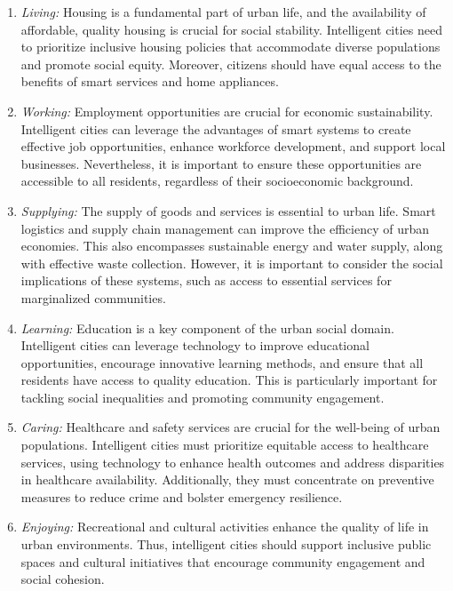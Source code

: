 \documentclass[smartcities,article,submit,pdftex,moreauthors]{Definitions/mdpi}
\begin{document}
\begin{enumerate}
    \item \textit{Living:} Housing is a fundamental part of urban life, and the availability of affordable, quality housing is crucial for social stability. Intelligent cities need to prioritize inclusive housing policies that accommodate diverse populations and promote social equity. Moreover, citizens should have equal access to the benefits of smart services and home appliances.

    \item \textit{Working:} Employment opportunities are crucial for economic sustainability. Intelligent cities can leverage the advantages of smart systems to create effective job opportunities, enhance workforce development, and support local businesses. Nevertheless, it is important to ensure these opportunities are accessible to all residents, regardless of their socioeconomic background.

    \item \textit{Supplying:} The supply of goods and services is essential to urban life. Smart logistics and supply chain management can improve the efficiency of urban economies. This also encompasses sustainable energy and water supply, along with effective waste collection. However, it is important to consider the social implications of these systems, such as access to essential services for marginalized communities.

    \item \textit{Learning:} Education is a key component of the urban social domain. Intelligent cities can leverage technology to improve educational opportunities, encourage innovative learning methods, and ensure that all residents have access to quality education. This is particularly important for tackling social inequalities and promoting community engagement. 

    \item \textit{Caring:} Healthcare and safety services are crucial for the well-being of urban populations. Intelligent cities must prioritize equitable access to healthcare services, using technology to enhance health outcomes and address disparities in healthcare availability. Additionally, they must concentrate on preventive measures to reduce crime and bolster emergency resilience.

    \item \textit{Enjoying:} Recreational and cultural activities enhance the quality of life in urban environments. Thus, intelligent cities should support inclusive public spaces and cultural initiatives that encourage community engagement and social cohesion.
\end{enumerate}
\end{document}
